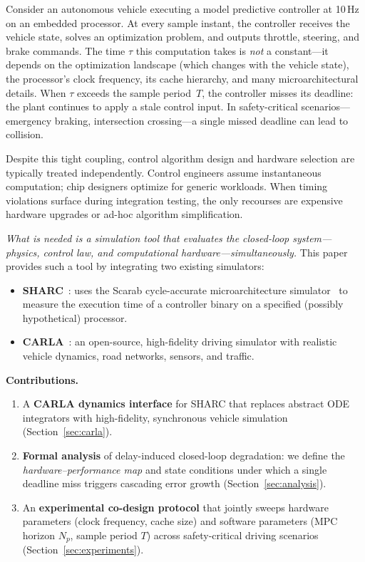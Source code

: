 \documentclass[conference]{IEEEtran}
\begin{document}
Consider an autonomous vehicle executing a model predictive controller
at 10\,Hz on an embedded processor.  At every sample instant, the
controller receives the vehicle state, solves an optimization problem,
and outputs throttle, steering, and brake commands.  The time $\tau$
this computation takes is \emph{not} a constant---it depends on the
optimization landscape (which changes with the vehicle state), the
processor's clock frequency, its cache hierarchy, and many
microarchitectural details.  When $\tau$ exceeds the sample
period~$T$, the controller misses its deadline: the plant continues to
apply a stale control input.  In safety-critical scenarios---emergency
braking, intersection crossing---a single missed deadline can lead to
collision.

Despite this tight coupling, control algorithm design and hardware
selection are typically treated independently.  Control engineers assume
instantaneous computation; chip designers optimize for generic
workloads.  When timing violations surface during integration testing,
the only recourses are expensive hardware upgrades or ad-hoc algorithm
simplification.

\emph{What is needed is a simulation tool that evaluates the
closed-loop system---physics, control law, and computational
hardware---simultaneously.}  This paper provides such a tool by
integrating two existing simulators:

\begin{itemize}
  \item \textbf{SHARC}~\cite{wintz2025sharc}: uses the Scarab
    cycle-accurate microarchitecture simulator~\cite{scarab} to
    measure the execution time of a controller binary on a specified
    (possibly hypothetical) processor.
  \item \textbf{CARLA}~\cite{dosovitskiy2017carla}: an open-source,
    high-fidelity driving simulator with realistic vehicle dynamics,
    road networks, sensors, and traffic.
\end{itemize}

\noindent\textbf{Contributions.}
\begin{enumerate}
  \item A \textbf{CARLA dynamics interface} for SHARC that replaces
    abstract ODE integrators with high-fidelity, synchronous vehicle
    simulation (Section~\ref{sec:carla}).
  \item \textbf{Formal analysis} of delay-induced closed-loop
    degradation: we define the \emph{hardware--performance map} and
    state conditions under which a single deadline miss triggers
    cascading error growth (Section~\ref{sec:analysis}).
  \item An \textbf{experimental co-design protocol} that jointly sweeps
    hardware parameters (clock frequency, cache size) and software
    parameters (MPC horizon $N_p$, sample period $T$) across
    safety-critical driving scenarios
    (Section~\ref{sec:experiments}).
\end{enumerate}
\end{document}
